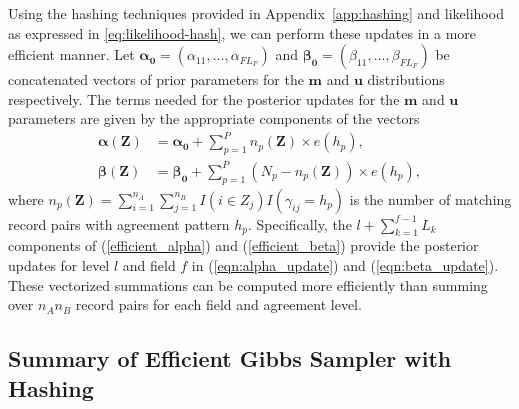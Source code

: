\documentclass[12pt,letterpaper]{article}
\newcommand{\1}[1]{\mathbb{I}\!\left[#1\right]} %
\begin{document}
Using the hashing techniques provided in Appendix~\ref{app:hashing} and likelihood as expressed in \eqref{eq:likelihood-hash}, we can perform these updates in a more efficient manner. Let $\bm{\alpha_0} = (\alpha_{11}, \ldots, \alpha_{F L_F})$ and $\bm{\beta_0}= (\beta_{11}, \ldots, \beta_{F L_F})$ be concatenated vectors of prior parameters for the $\bm{m}$ and $\bm{u}$ distributions respectively. The terms needed for the posterior updates for the $\bm{m}$ and $\bm{u}$ parameters are given by the appropriate components of the vectors
	\begin{align}
		\bm{\alpha(\bm{Z})} &= \bm{\alpha_0} + \sum_{p=1}^P n_p\left(\bm{Z} \right) \times e(h_p), \label{efficient_alpha} \\
		\bm{\beta(\bm{Z})} &= \bm{\beta_0} + \sum_{p=1}^P \left(N_p - n_p\left(\bm{Z}\right)\right) \times e(h_p), \label{efficient_beta}
	\end{align}
where $n_p(\bm{Z}) = \sum_{i = 1}^{n_A}\sum_{j = 1}^{n_B} I(i \in Z_{j}) I\left(\gamma_{ij} = h_p \right)$ is the number of matching record pairs with agreement pattern $h_p$. Specifically, the $l + \sum_{k=1}^{f-1} L_k$ components of (\ref{efficient_alpha}) and (\ref{efficient_beta}) provide the posterior updates for level $l$ and field $f$ in (\ref{eqn:alpha_update}) and (\ref{eqn:beta_update}). These vectorized summations can be computed more efficiently than summing over $n_A n_B$ record pairs for each field and agreement level.

\subsection{Summary of Efficient Gibbs Sampler with Hashing} \label{app:efficient-algorithm}
\end{document}
